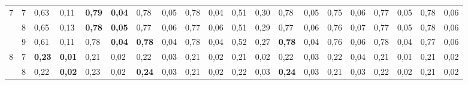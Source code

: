 \documentclass[conference]{IEEEtran}
\begin{document}
\begin{table}[]
\begin{tabular}{|cl|ll|ll|ll|ll|ll|ll|ll|ll|ll|}
		\multicolumn{1}{|c|}{\multirow{3}{*}{7}}  & 7 & \multicolumn{1}{l|}{0,63}          & 0,11          & \multicolumn{1}{l|}{\textbf{0,79}} & \textbf{0,04} & \multicolumn{1}{l|}{0,78}          & 0,05          & \multicolumn{1}{l|}{0,78} & 0,04          & \multicolumn{1}{l|}{0,51}                 & 0,30          & \multicolumn{1}{l|}{0,78}          & 0,05          & \multicolumn{1}{l|}{0,75}          & 0,06          & \multicolumn{1}{l|}{0,77}          & 0,05          & \multicolumn{1}{l|}{0,78}          & 0,06          \\ \cline{2-20} 
		\multicolumn{1}{|c|}{}                    & 8 & \multicolumn{1}{l|}{0,65}          & 0,13          & \multicolumn{1}{l|}{\textbf{0,78}} & \textbf{0,05} & \multicolumn{1}{l|}{0,77}          & 0,06          & \multicolumn{1}{l|}{0,77} & 0,06          & \multicolumn{1}{l|}{0,51}                 & 0,29          & \multicolumn{1}{l|}{0,77}          & 0,06          & \multicolumn{1}{l|}{0,76}          & 0,07          & \multicolumn{1}{l|}{0,77}          & 0,05          & \multicolumn{1}{l|}{0,78}          & 0,06          \\ \cline{2-20} 
		\multicolumn{1}{|c|}{}                    & 9 & \multicolumn{1}{l|}{0,61}          & 0,11          & \multicolumn{1}{l|}{0,78}          & \textbf{0,04} & \multicolumn{1}{l|}{\textbf{0,78}} & 0,04          & \multicolumn{1}{l|}{0,78} & 0,04          & \multicolumn{1}{l|}{0,52}                 & 0,27          & \multicolumn{1}{l|}{\textbf{0,78}} & 0,04          & \multicolumn{1}{l|}{0,76}          & 0,06          & \multicolumn{1}{l|}{0,78}          & 0,04          & \multicolumn{1}{l|}{0,77}          & 0,06          \\ \hline
		\multicolumn{1}{|c|}{\multirow{3}{*}{8}}  & 7 & \multicolumn{1}{l|}{\textbf{0,23}} & \textbf{0,01} & \multicolumn{1}{l|}{0,21}          & 0,02          & \multicolumn{1}{l|}{0,22}          & 0,03          & \multicolumn{1}{l|}{0,21} & 0,02          & \multicolumn{1}{l|}{0,21}                 & 0,02          & \multicolumn{1}{l|}{0,22}          & 0,03          & \multicolumn{1}{l|}{0,22}          & 0,04          & \multicolumn{1}{l|}{0,21}          & 0,01          & \multicolumn{1}{l|}{0,21}          & 0,02          \\ \cline{2-20} 
		\multicolumn{1}{|c|}{}                    & 8 & \multicolumn{1}{l|}{0,22}          & \textbf{0,02} & \multicolumn{1}{l|}{0,23}          & 0,02          & \multicolumn{1}{l|}{\textbf{0,24}} & 0,03          & \multicolumn{1}{l|}{0,21} & 0,02          & \multicolumn{1}{l|}{0,22}                 & 0,03          & \multicolumn{1}{l|}{\textbf{0,24}} & 0,03          & \multicolumn{1}{l|}{0,21}          & 0,03          & \multicolumn{1}{l|}{0,22}          & 0,02          & \multicolumn{1}{l|}{0,21}          & 0,02          \\ \cline{2-20} 

\end{tabular}
\end{table}
\end{document}
